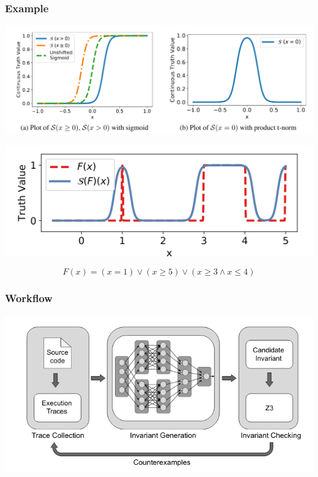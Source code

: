 \documentclass[11pt]{beamer}
\begin{document}
\begin{frame}\frametitle{Example}
\begin{center}
\includegraphics[scale=0.24]{4b.png}

\includegraphics[scale=0.36]{4.png}
\end{center}

\[F(x) = (x = 1)\vee (x \ge 5) \vee (x \ge 3 \wedge x \le 4)\]

\end{frame}
\begin{frame}\frametitle{Workflow}
\begin{center}
\includegraphics[scale=0.45]{5.png}
\end{center}


\end{frame}
\end{document}
